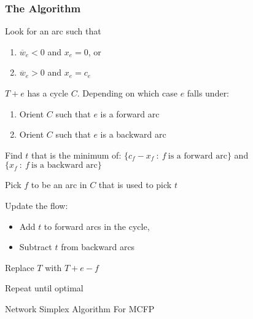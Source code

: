 \subsubsection{The Algorithm}

\IncMargin{1em}
\begin{algorithm}[H]\label{alg:nsm-mcfp}


  \BlankLine
  
  \nl Look for an arc such that
  \begin{enumerate}
      \item $\overline{w}_{e} < 0$ and $x_e = 0$, or 
      \item $\overline{w}_{e} > 0$ and $x_e = c_e$
  \end{enumerate}

  \nl $T + e$ has a cycle $C$. Depending on which case $e$ falls under:
  \begin{enumerate}
      \item Orient $C$ such that $e$ is a forward arc
      \item Orient $C$ such that $e$ is a backward arc
  \end{enumerate}

  \nl Find $t$ that is the minimum of: $\{c_f - x_f\::\:f\:\text{is a forward arc}\}$ and $\{x_f\::\:f\:\text{is a backward arc}\}$

  \nl Pick $f$ to be an arc in $C$ that is used to pick $t$

  \nl Update the flow:
  \begin{itemize}
      \item Add $t$ to forward arcs in the cycle,
      \item Subtract $t$ from backward arcs
  \end{itemize}

  \nl Replace $T$ with $T + e - f$

  \nl Repeat until optimal

  \caption{Network Simplex Algorithm For MCFP}
\end{algorithm}
